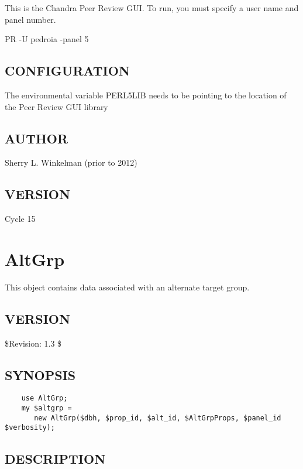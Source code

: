 \documentclass{article}
\begin{document}
This is the Chandra Peer Review GUI.  To run, you must specify a user name 
and panel number.



PR -U pedroia -panel 5

\subsection*{CONFIGURATION\label{PR_CONFIGURATION}}


The environmental variable PERL5LIB needs to be pointing to the location of the
Peer Review GUI library

\subsection*{AUTHOR\label{PR_AUTHOR}}


Sherry L. Winkelman  (prior to 2012)

\subsection*{VERSION\label{PR_VERSION}}


Cycle 15

\clearpage
\section{AltGrp\label{AltGrp}}


This object contains data associated with an alternate target group.

\subsection*{VERSION\label{AltGrp_VERSION}}


\$Revision: 1.3 \$

\subsection*{SYNOPSIS\label{AltGrp_SYNOPSIS}}
\begin{verbatim}
    use AltGrp;
    my $altgrp = 
       new AltGrp($dbh, $prop_id, $alt_id, $AltGrpProps, $panel_id $verbosity);
\end{verbatim}
\subsection*{DESCRIPTION\label{AltGrp_DESCRIPTION}}
\end{document}
